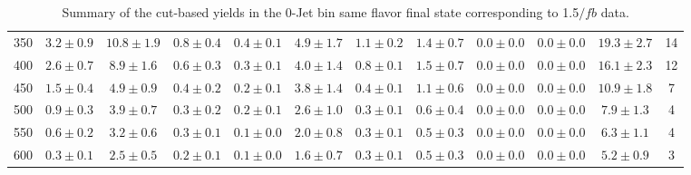 \begin{table}[!hb]
{\begin{center}
\begin{tabular}{l c c c c c c c c c c c }
350 & $3.2\pm0.9$ & $10.8\pm1.9$ & $0.8\pm0.4$ & $0.4\pm0.1$ & $4.9\pm1.7$ & $1.1\pm0.2$ & $1.4\pm0.7$ & $0.0\pm0.0$ & $0.0\pm0.0$ & $19.3\pm2.7$ & 14 \\
400 & $2.6\pm0.7$ & $8.9\pm1.6$ & $0.6\pm0.3$ & $0.3\pm0.1$ & $4.0\pm1.4$ & $0.8\pm0.1$ & $1.5\pm0.7$ & $0.0\pm0.0$ & $0.0\pm0.0$ & $16.1\pm2.3$ & 12 \\
450 & $1.5\pm0.4$ & $4.9\pm0.9$ & $0.4\pm0.2$ & $0.2\pm0.1$ & $3.8\pm1.4$ & $0.4\pm0.1$ & $1.1\pm0.6$ & $0.0\pm0.0$ & $0.0\pm0.0$ & $10.9\pm1.8$ & 7 \\
500 & $0.9\pm0.3$ & $3.9\pm0.7$ & $0.3\pm0.2$ & $0.2\pm0.1$ & $2.6\pm1.0$ & $0.3\pm0.1$ & $0.6\pm0.4$ & $0.0\pm0.0$ & $0.0\pm0.0$ & $7.9\pm1.3$ & 4 \\
550 & $0.6\pm0.2$ & $3.2\pm0.6$ & $0.3\pm0.1$ & $0.1\pm0.0$ & $2.0\pm0.8$ & $0.3\pm0.1$ & $0.5\pm0.3$ & $0.0\pm0.0$ & $0.0\pm0.0$ & $6.3\pm1.1$ & 4 \\
600 & $0.3\pm0.1$ & $2.5\pm0.5$ & $0.2\pm0.1$ & $0.1\pm0.0$ & $1.6\pm0.7$ & $0.3\pm0.1$ & $0.5\pm0.3$ & $0.0\pm0.0$ & $0.0\pm0.0$ & $5.2\pm0.9$ & 3 \\
\hline
\end{tabular}
\end{center}
}
\caption{Summary of the cut-based yields in the 0-Jet bin same flavor final state corresponding to 1.5$/fb$ data.}
\end{table}
